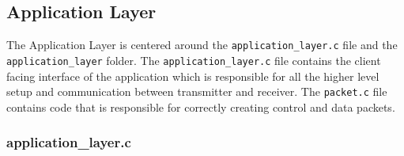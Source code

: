 \documentclass[11pt,a4paper,twocolumn]{article}
\begin{document}
\subsection{Application Layer}

The Application Layer is centered around the \lstinline{application_layer.c} file and the \lstinline{application_layer} folder.
The \lstinline{application_layer.c} file contains the client facing interface of the application which is responsible for all the higher level setup and communication between transmitter and receiver.
The \lstinline{packet.c} file contains code that is responsible for correctly creating control and data packets.

\subsubsection{application\_layer.c}
\end{document}
